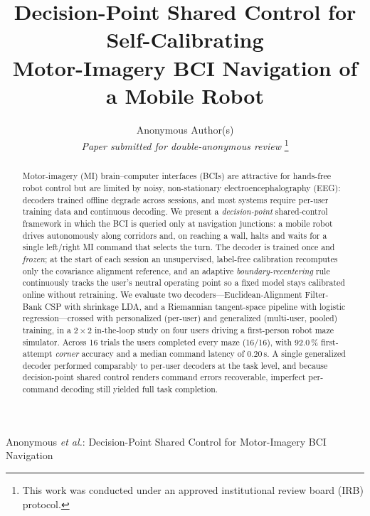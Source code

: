 \documentclass[10pt,journal]{IEEEtran}
\begin{document}
\title{Decision-Point Shared Control for Self-Calibrating\\ Motor-Imagery BCI Navigation of a Mobile Robot}

\author{Anonymous Author(s)\\ \textit{Paper submitted for double-anonymous review}%
\thanks{This work was conducted under an approved institutional review board (IRB) protocol.}}

%
{Anonymous \MakeLowercase{\textit{et al.}}: Decision-Point Shared Control for Motor-Imagery BCI Navigation}

\maketitle

\begin{abstract}
Motor-imagery (MI) brain--computer interfaces (BCIs) are attractive for hands-free
robot control but are limited by noisy, non-stationary electroencephalography (EEG):
decoders trained offline degrade across sessions, and most systems require per-user
training data and continuous decoding. We present a \emph{decision-point} shared-control
framework in which the BCI is queried only at navigation junctions: a mobile robot drives
autonomously along corridors and, on reaching a wall, halts and waits for a single left/right
MI command that selects the turn. The decoder is trained once and \emph{frozen}; at the start
of each session an unsupervised, label-free calibration recomputes only the covariance
alignment reference, and an adaptive \emph{boundary-recentering} rule continuously tracks the
user's neutral operating point so a fixed model stays calibrated online without retraining.
We evaluate two decoders---Euclidean-Alignment Filter-Bank CSP with shrinkage LDA, and a
Riemannian tangent-space pipeline with logistic regression---crossed with personalized (per-user)
and generalized (multi-user, pooled) training, in a $2{\times}2$ in-the-loop study on four users
driving a first-person robot maze simulator. Across 16 trials the users completed every maze
(16/16), with 92.0\,\% first-attempt \emph{corner} accuracy and a median command latency of
0.20\,s. A single generalized decoder performed comparably to per-user decoders at the task
level, and because decision-point shared control renders command errors recoverable, imperfect
per-command decoding still yielded full task completion.
\end{abstract}
\end{document}
